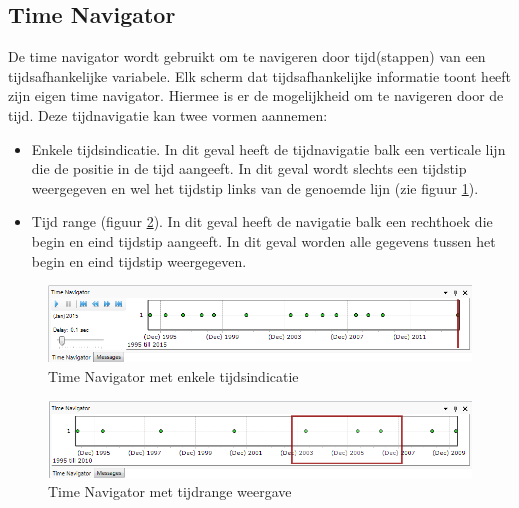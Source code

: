 \subsection{Time Navigator}
	\label{sec:TimeSeriesNavigator}
De time navigator wordt gebruikt om te navigeren door tijd(stappen) van een tijdsafhankelijke variabele. Elk scherm dat tijdsafhankelijke informatie toont heeft zijn eigen time navigator. Hiermee is er de mogelijkheid om te navigeren door de tijd. Deze tijdnavigatie kan twee vormen aannemen:
\begin{itemize}
\item Enkele tijdsindicatie. In dit geval heeft de tijdnavigatie balk een verticale lijn die de positie in de tijd aangeeft. In dit geval wordt slechts een tijdstip weergegeven en wel het tijdstip links van de genoemde lijn (zie figuur \ref{fig:TimeSeriesNavigator}). 
\item Tijd range (figuur \ref{fig:TimeSeriesNavigator_Range}). In dit geval heeft de navigatie balk een rechthoek die begin en eind tijdstip aangeeft. In dit geval worden alle gegevens tussen het begin en eind tijdstip weergegeven.
\end{itemize}

\begin{figure}[H]
	\centering
		\includegraphics[width=\textwidth]{figures/chapter_general/TimeSeriesNavigator.png}
		\caption{Time Navigator met enkele tijdsindicatie}
	\label{fig:TimeSeriesNavigator}
\end{figure}
\begin{figure}[H]
	\centering
		\includegraphics[width=\textwidth]{figures/chapter_general/TimeSeriesNavigator_Range.png}
		\caption{Time Navigator met tijdrange weergave}
	\label{fig:TimeSeriesNavigator_Range}
\end{figure}

